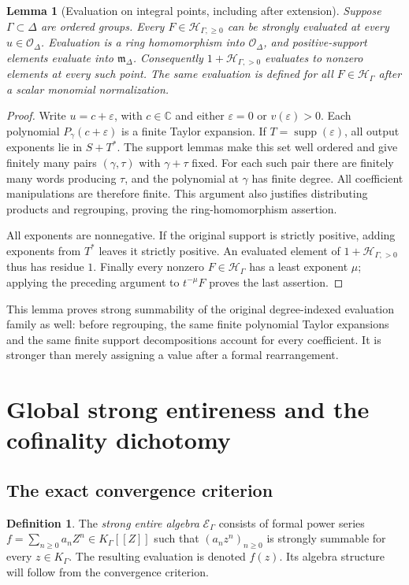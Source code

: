 \documentclass[11pt,letterpaper]{article}
\numberwithin{equation}{section}
\newtheorem{lemma}[theorem]{Lemma}
\theoremstyle{definition}
\newtheorem{definition}[theorem]{Definition}
\theoremstyle{remark}
\newcommand{\C}{\mathbb C}
\newcommand{\supp}{\operatorname{supp}}
\begin{document}
\begin{lemma}[Evaluation on integral points, including after extension]
\label{lem:integral-eval}
Suppose $\Gamma\subset\Delta$ are ordered groups. Every
$F\in\mathcal H_{\Gamma,\ge0}$ can be strongly evaluated at every
$u\in\mathcal O_\Delta$. Evaluation is a ring homomorphism into
$\mathcal O_\Delta$, and positive-support elements evaluate into
$\mathfrak m_\Delta$. Consequently $1+\mathcal H_{\Gamma,>0}$ evaluates to
nonzero elements at every such point. The same evaluation is defined for
all $F\in\mathcal H_\Gamma$ after a scalar monomial normalization.
\end{lemma}
\begin{proof}
Write $u=c+\varepsilon$, with $c\in\C$ and either $\varepsilon=0$ or
$v(\varepsilon)>0$. Each polynomial $P_\gamma(c+\varepsilon)$ is a finite
Taylor expansion. If $T=\supp(\varepsilon)$, all output exponents lie in
$S+T^*$. The support lemmas make this set well ordered and give finitely many
pairs $(\gamma,\tau)$ with $\gamma+\tau$ fixed. For each such pair there are
finitely many words producing $\tau$, and the polynomial at $\gamma$ has
finite degree. All coefficient manipulations are therefore finite.
This argument also justifies distributing products and regrouping, proving
the ring-homomorphism assertion.

All exponents are nonnegative. If the original support is strictly positive,
adding exponents from $T^*$ leaves it strictly positive. An evaluated element
of $1+\mathcal H_{\Gamma,>0}$ thus has residue $1$. Finally every nonzero
$F\in\mathcal H_\Gamma$ has a least exponent $\mu$; applying the preceding
argument to $t^{-\mu}F$ proves the last assertion.
\end{proof}

This lemma proves strong summability of the original degree-indexed evaluation
family as well: before regrouping, the same finite polynomial Taylor
expansions and the same finite support decompositions account for every
coefficient. It is stronger than merely assigning a value after a formal
rearrangement.

\section{Global strong entireness and the cofinality dichotomy}
\label{sec:cofinality}

\subsection{The exact convergence criterion}
\begin{definition}
The \emph{strong entire algebra} $\mathcal E_\Gamma$ consists of formal power
series $f=\sum_{n\ge0}a_nZ^n\in K_\Gamma[[Z]]$ such that
$(a_nz^n)_{n\ge0}$ is strongly summable for every $z\in K_\Gamma$.
The resulting evaluation is denoted $f(z)$. Its algebra structure will follow
from the convergence criterion.
\end{definition}
\end{document}
